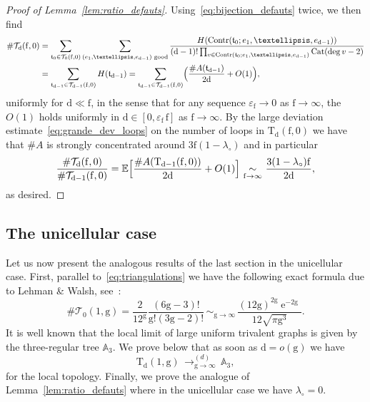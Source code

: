 \documentclass[11pt]{article}
\DeclareMathOperator{\Cat}{Cat}
\theoremstyle{plain}
\theoremstyle{definition}
\theoremstyle{remark}
\newcommand{\E}{\mathbb{E}}
\newcommand{\e}{\operatorname{e}}
\newcommand{\Triv}{\mathrm{T}}
\newcommand{\face}{\mathrm{f}}
\newcommand{\defect}{\mathrm{d}}
\newcommand{\gen}{\mathrm{g}}
\newcommand{\cvloi}[1][n]{\,\mathop{\longrightarrow}^{(d)}_{#1 \to \infty}\,}
\newcommand{\equi}[1][n]{\,\mathop{\sim}^{}_{#1 \to \infty}\,}
\begin{document}
\begin{proof}[Proof of Lemma~\ref{lem:ratio_defauts}]
Using~\eqref{eq:bijection_defauts} twice, we then find
\begin{align*}
\# \mathcal{T}_\defect(\face, 0)
&= \sum_{\mathfrak{t}_0 \in \mathcal{T}_0(\face, 0)} \sum_{(e_1, \dots, e_{\defect-1}) \text{ good}} \frac{H(\mathrm{Contr}(\mathfrak{t}_0 ; e_1, \dots, e_{ \defect-1}))}{(\defect-1)! \prod_{v \in \mathrm{Contr}(\mathfrak{t}_0 ; e_1, \dots, e_{\defect-1})} \Cat(\deg v - 2)}
\\
&= \sum_{ \mathfrak{t}_{ \defect-1} \in \mathcal{T}_{ \defect-1}(\face,0) } H(\mathfrak{t}_{\defect-1})
= \sum_{ \mathfrak{t}_{ \defect-1} \in \mathcal{T}_{ \defect-1}(\face,0)} \Bigl(\frac{\# A(\mathfrak{t}_{ \defect-1})}{2 \defect} + O(1)\Bigr),
\end{align*}
uniformly for $\defect \ll \face$, in the sense that for any sequence $\varepsilon_\face \to 0$ as $\face \to \infty$, the $O(1)$ holds uniformly in $\defect \in [0, \varepsilon_\face\, \face]$ as $\face \to \infty$.
By the large deviation estimate~\eqref{eq:grande_dev_loops} on the number of loops in $\mathrm{T}_{ \defect}(\face,0)$ we have that $\#A$ is strongly concentrated around $3\face (1-\lambda_{\circ})$ and in particular
\[
\frac{\# \mathcal{T}_\defect(\face, 0)}{\# \mathcal{T}_{\defect-1}(\face, 0)}
= \E\Bigl[\frac{\# A(\Triv_{ \defect-1}(\face,0))}{2 \defect} + O(1)\Bigr]
\equi[\face] \frac{ 3(1-\lambda_\circ) \face}{2 \defect},
\]
as desired.
\end{proof}

\subsection{The unicellular case}
\label{ssec:unicellularestimates}

Let us now present the analogous results of the last section in the unicellular case. First, parallel to~\eqref{eq:triangulations} we have the following exact formula due to Lehman \& Walsh, see~\cite[Eq.\,(9)]{WL72}:
\begin{equation}\label{eq:triangulations_high_gen}
\#\mathcal{T}_{0}(1,\gen) = \frac{2}{12^{\gen}} \frac{(6\gen-3)!}{\gen!(3\gen-2)!}
\equi[\gen] \frac{(12 \gen)^{2\gen} \e^{-2\gen}}{12 \sqrt{\pi \gen^3}}.
\end{equation}
It is well known that the local limit of large uniform trivalent graphs is given by the three-regular tree $\mathbb{A}_3$.
We prove below that as soon as $ \defect =o(\gen)$ we have
\begin{equation} \label{eq:convthree-regular}
\Triv_{ \defect}(1, \gen) \cvloi[\gen] \mathbb{A}_3,
\end{equation}
for the local topology. Finally, we prove the analogue of Lemma~\ref{lem:ratio_defauts} where in the unicellular case we have $\lambda_{\circ} =0$.
\end{document}
